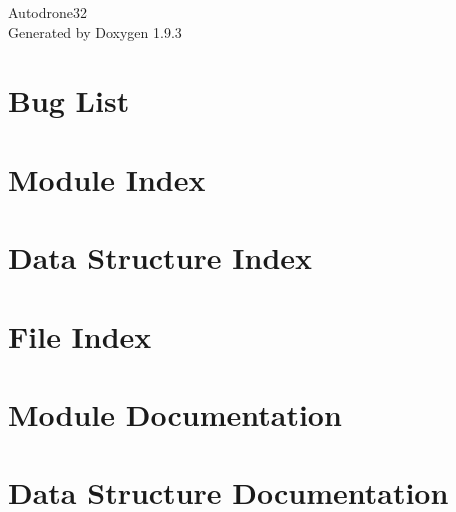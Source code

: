 \documentclass[twoside]{book}
\newcommand{\+}{\discretionary{\mbox{\scriptsize$\hookleftarrow$}}{}{}}
\newcommand{\clearemptydoublepage}{%
    \newpage{\pagestyle{empty}\cleardoublepage}%
  }
\begin{document}
  \raggedbottom
    \hypersetup{pageanchor=false,
                bookmarksnumbered=true,
                pdfencoding=unicode
               }
  \begin{titlepage}
  \vspace*{7cm}
  \begin{center}%
  {\Large Autodrone32}\\
  \vspace*{1cm}
  {\large Generated by Doxygen 1.9.3}\\
  \end{center}
  \end{titlepage}
  \clearemptydoublepage
  \tableofcontents
  \clearemptydoublepage
  \hypersetup{pageanchor=true}
\chapter{Bug List}
\label{bug}

\chapter{Module Index}

\chapter{Data Structure Index}

\chapter{File Index}

\chapter{Module Documentation}










\chapter{Data Structure Documentation}











\end{document}
